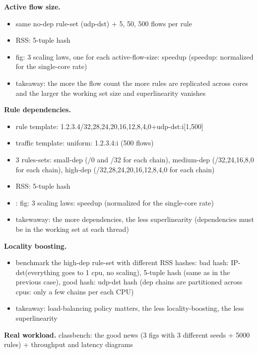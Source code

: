 \noindent%
\textbf{Active flow size.} %
\begin{itemize}
\item same no-dep rule-set (udp-dst) + 5, 50, 500 flows per rule
\item RSS: 5-tuple hash
\item fig: 3 scaling laws, one for each active-flow-size: speedup (speedup: normalized for the single-core rate)
\item takeaway: the more the flow count the more rules are replicated across cores and the larger the working set size and superlinearity vanishes
\end{itemize}

\noindent%
\textbf{Rule dependencies.} %
\begin{itemize}
\item rule template: 1.2.3.4/{32,28,24,20,16,12,8,4,0}+udp-dst:i[1,500]
\item   traffic template: uniform: 1.2.3.4:i (500 flows) 
\item   3 rules-sets: small-dep (/0 and /32 for each chain), medium-dep (/{32,24,16,8,0}  for each chain), high-dep (/{32,28,24,20,16,12,8,4,0}  for each chain)
\item   RSS: 5-tuple hash
\item: fig: 3 scaling laws: speedup (normalized for the single-core rate)
\item takewaway: the more dependencies, the less superlinearity (dependencies must be in the working set at each thread)
\end{itemize}

\noindent%
\textbf{Locality boosting.} %
\begin{itemize}
\item benchmark the high-dep rule-set with different RSS hashes: bad hash: IP-dst(everything goes to 1 cpu, no scaling), 5-tuple hash (same as in the previous case), good hash: udp-dst hash (dep chains are partitioned across cpus: only a few chains per each CPU) 
\item  takeaway: load-balancing policy matters, the less locality-boosting, the less superlinearity
\end{itemize}

\noindent%
\textbf{Real workload.} %
classbench: the good news (3 figs with 3 different seeds + 5000 rules) + throughput and latency diagrams


